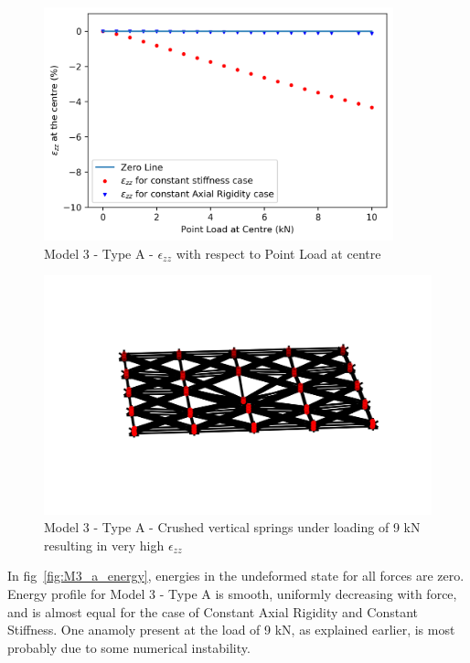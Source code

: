 \begin{figure}[!htbp]
    \centering
    \includegraphics[width = 0.9\textwidth]{Figures/M3_a_strain.png}
    \caption{Model 3 - Type A - $\epsilon_{zz}$ with respect to Point Load at centre}
    \label{fig:M3_a_strain_plt}
\end{figure}

\begin{figure}
    \centering
    \includegraphics{Figures/M3_a_crushed.png}
    \caption{Model 3 - Type A - Crushed vertical springs under loading of 9 kN resulting in very high $\epsilon_{zz}$}
    \label{fig:M3_a_crushed}
\end{figure}

In fig~\ref{fig:M3_a_energy}, energies in the undeformed state for all forces are zero. Energy profile for Model 3 - Type A is smooth, uniformly decreasing with force, and is almost equal for the case of Constant Axial Rigidity and Constant Stiffness. One anamoly present at the load of 9 kN, as explained earlier, is most probably due to some numerical instability.


